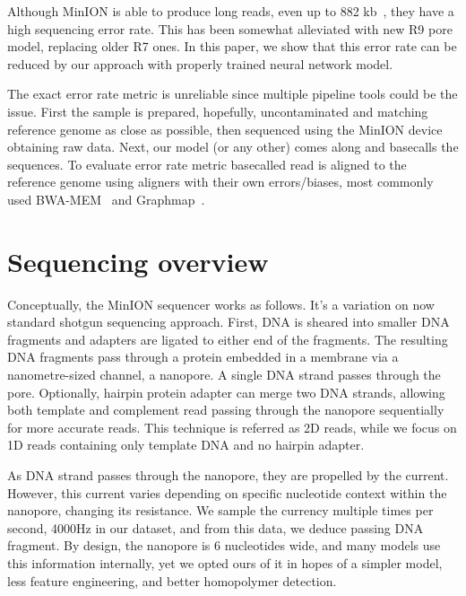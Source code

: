 \documentclass[runningheads,a4paper]{llncs}
\begin{document}
Although MinION is able to produce long reads, even up to 882 kb~\cite{loman1-100k,loman2-800k}, they have a high sequencing error rate. This has been somewhat alleviated with new R9 pore model, replacing older R7 ones. In this paper, we show that this error rate can be reduced by our approach with properly trained neural network model.

The exact error rate metric is unreliable since multiple pipeline tools could be the issue. First the sample is prepared, hopefully, uncontaminated and matching reference genome as close as possible, then sequenced using the MinION device obtaining raw data. Next, our model (or any other) comes along and basecalls the sequences. To evaluate error rate metric basecalled read is aligned to the reference genome using aligners with their own errors/biases, most commonly used BWA-MEM~\cite{li2013aligning} and Graphmap~\cite{sovic2016fast}.

\section{Sequencing overview}
Conceptually, the MinION sequencer works as follows. It's a variation on now standard shotgun sequencing approach. First, DNA is sheared into smaller DNA fragments and adapters are ligated to either end of the fragments. The resulting DNA fragments pass through a protein embedded in a membrane via a nanometre-sized channel, a nanopore. A single DNA strand passes through the pore. Optionally, hairpin protein adapter can merge two DNA strands, allowing both template and complement read passing through the nanopore sequentially for more accurate reads. This technique is referred as 2D reads, while we focus on 1D reads containing only template DNA and no hairpin adapter.

As DNA strand passes through the nanopore, they are propelled by the current. However, this current varies depending on specific nucleotide context within the nanopore, changing its resistance. We sample the currency multiple times per second, 4000Hz in our dataset, and from this data, we deduce passing DNA fragment. By design, the nanopore is 6 nucleotides wide, and many models use this information internally, yet we opted ours of it in hopes of a simpler model, less feature engineering, and better homopolymer detection.


\end{document}
